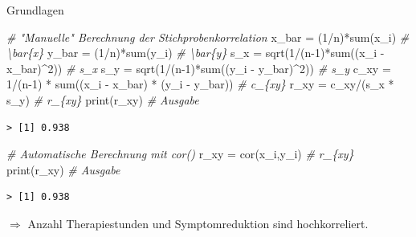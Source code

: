 \documentclass[
  8pt,
  ignorenonframetext,
]{beamer}
\newenvironment{Shaded}{\begin{snugshade}}{\end{snugshade}}
\newcommand{\CommentTok}[1]{\textcolor[rgb]{0.56,0.35,0.01}{\textit{#1}}}
\newcommand{\DecValTok}[1]{\textcolor[rgb]{0.00,0.00,0.81}{#1}}
\newcommand{\FunctionTok}[1]{\textcolor[rgb]{0.00,0.00,0.00}{#1}}
\newcommand{\NormalTok}[1]{#1}
\newcommand{\OtherTok}[1]{\textcolor[rgb]{0.56,0.35,0.01}{#1}}
\newcommand{\SpecialCharTok}[1]{\textcolor[rgb]{0.00,0.00,0.00}{#1}}
\begin{document}
\begin{frame}[fragile]{Grundlagen}
\begin{Shaded}
\begin{Highlighting}[]
\CommentTok{\# "Manuelle" Berechnung der Stichprobenkorrelation}
\NormalTok{x\_bar }\OtherTok{=}\NormalTok{ (}\DecValTok{1}\SpecialCharTok{/}\NormalTok{n)}\SpecialCharTok{*}\FunctionTok{sum}\NormalTok{(x\_i)                                                           }\CommentTok{\# \textbackslash{}bar\{x\}}
\NormalTok{y\_bar }\OtherTok{=}\NormalTok{ (}\DecValTok{1}\SpecialCharTok{/}\NormalTok{n)}\SpecialCharTok{*}\FunctionTok{sum}\NormalTok{(y\_i)                                                           }\CommentTok{\# \textbackslash{}bar\{y\}}
\NormalTok{s\_x   }\OtherTok{=} \FunctionTok{sqrt}\NormalTok{(}\DecValTok{1}\SpecialCharTok{/}\NormalTok{(n}\DecValTok{{-}1}\NormalTok{)}\SpecialCharTok{*}\FunctionTok{sum}\NormalTok{((x\_i }\SpecialCharTok{{-}}\NormalTok{ x\_bar)}\SpecialCharTok{\^{}}\DecValTok{2}\NormalTok{))                                       }\CommentTok{\# s\_x}
\NormalTok{s\_y   }\OtherTok{=} \FunctionTok{sqrt}\NormalTok{(}\DecValTok{1}\SpecialCharTok{/}\NormalTok{(n}\DecValTok{{-}1}\NormalTok{)}\SpecialCharTok{*}\FunctionTok{sum}\NormalTok{((y\_i }\SpecialCharTok{{-}}\NormalTok{ y\_bar)}\SpecialCharTok{\^{}}\DecValTok{2}\NormalTok{))                                       }\CommentTok{\# s\_y}
\NormalTok{c\_xy  }\OtherTok{=} \DecValTok{1}\SpecialCharTok{/}\NormalTok{(n}\DecValTok{{-}1}\NormalTok{) }\SpecialCharTok{*} \FunctionTok{sum}\NormalTok{((x\_i }\SpecialCharTok{{-}}\NormalTok{ x\_bar) }\SpecialCharTok{*}\NormalTok{ (y\_i }\SpecialCharTok{{-}}\NormalTok{ y\_bar))                             }\CommentTok{\# c\_\{xy\}}
\NormalTok{r\_xy  }\OtherTok{=}\NormalTok{ c\_xy}\SpecialCharTok{/}\NormalTok{(s\_x }\SpecialCharTok{*}\NormalTok{ s\_y)                                                         }\CommentTok{\# r\_\{xy\}}
\FunctionTok{print}\NormalTok{(r\_xy)                                                                      }\CommentTok{\# Ausgabe}
\end{Highlighting}
\end{Shaded}

\begin{verbatim}
> [1] 0.938
\end{verbatim}

\begin{Shaded}
\begin{Highlighting}[]
\CommentTok{\# Automatische Berechnung mit cor()}
\NormalTok{r\_xy  }\OtherTok{=} \FunctionTok{cor}\NormalTok{(x\_i,y\_i)                                                             }\CommentTok{\# r\_\{xy\}}
\FunctionTok{print}\NormalTok{(r\_xy)                                                                      }\CommentTok{\# Ausgabe}
\end{Highlighting}
\end{Shaded}

\begin{verbatim}
> [1] 0.938
\end{verbatim}

\center

\(\Rightarrow\) Anzahl Therapiestunden und Symptomreduktion sind
hochkorreliert.
\end{frame}
\end{document}

